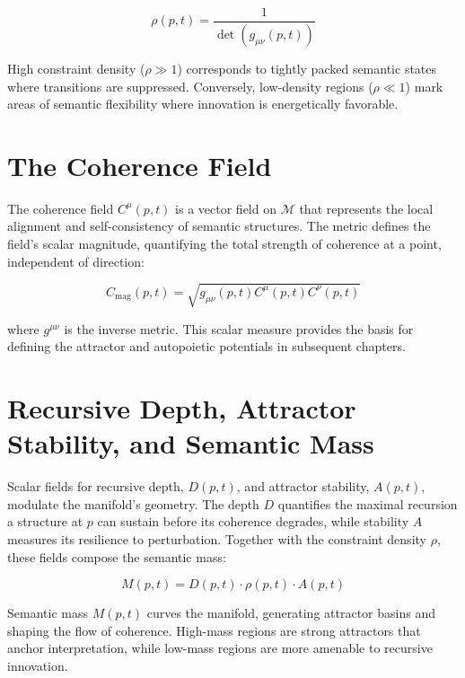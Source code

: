 \begin{equation}
\rho(p, t) = \frac{1}{\det(g_{\mu\nu}(p, t))}
\end{equation}

High constraint density (\(\rho \gg 1\)) corresponds to tightly packed semantic states where transitions are suppressed. Conversely, low-density regions (\(\rho \ll 1\)) mark areas of semantic flexibility where innovation is energetically favorable.


\section{The Coherence Field}
\label{3.5:the_coherence_field}

The coherence field \(C^\mu(p, t)\) is a vector field on \(\mathcal{M}\) that represents the local alignment and self-consistency of semantic structures. The metric defines the field's scalar magnitude, quantifying the total strength of coherence at a point, independent of direction:

\begin{equation}
C_{\mathrm{mag}}(p, t) = \sqrt{g_{\mu\nu}(p, t) C^\mu(p, t) C^\nu(p, t)}
\end{equation}

where \(g^{\mu\nu}\) is the inverse metric. This scalar measure provides the basis for defining the attractor and autopoietic potentials in subsequent chapters.


\section{Recursive Depth, Attractor Stability, and Semantic Mass}
\label{3.6:recursive_depth_attractor_stability_and_semantic_mass}

Scalar fields for recursive depth, \(D(p, t)\), and attractor stability, \(A(p, t)\), modulate the manifold's geometry. The depth \(D\) quantifies the maximal recursion a structure at \(p\) can sustain before its coherence degrades, while stability \(A\) measures its resilience to perturbation. Together with the constraint density \(\rho\), these fields compose the semantic mass:

\begin{equation}
M(p, t) = D(p, t) \cdot \rho(p, t) \cdot A(p, t)
\end{equation}

Semantic mass \(M(p,t)\) curves the manifold, generating attractor basins and shaping the flow of coherence. High-mass regions are strong attractors that anchor interpretation, while low-mass regions are more amenable to recursive innovation. 